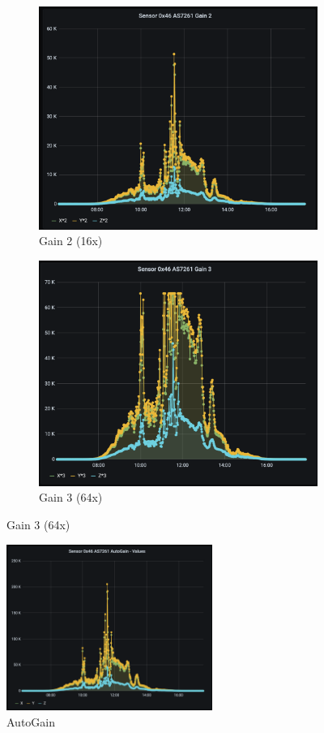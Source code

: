 \begin{figure}[H]
  \begin{subfigure}[b]{0.5\textwidth}
    \includegraphics[width=\textwidth]{img/Grafana-Gain2}
   \caption{Gain 2 (16x)}
	\label{fig:Grafana_Gain2}
  \end{subfigure}
  \begin{subfigure}[b]{0.5\textwidth}
    \includegraphics[width=\textwidth]{img/Grafana-Gain3}
	\caption{Gain 3 (64x)}
	\label{fig:Grafana_Gain3}
  \end{subfigure}
\end{figure}


\begin{figure}[H]
\centering
\includegraphics[width=0.6\textwidth]{img/Grafana-AutoGain}
\caption{AutoGain}
\label{fig:Grafana_AutoGain}
\end{figure}
